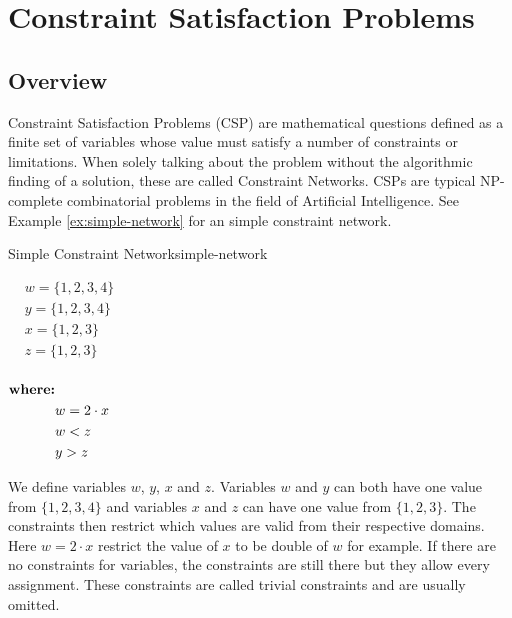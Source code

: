 \chapter{Constraint Satisfaction Problems} \label{chap:CSP}

\section{Overview}

Constraint Satisfaction Problems (CSP) \cite{csp:1987} are mathematical questions defined as a finite set of variables whose value must satisfy a number of constraints or limitations. When solely talking about the problem without the algorithmic finding of a solution, these are called Constraint Networks. CSPs are typical NP-complete combinatorial problems in the field of Artificial Intelligence. See Example \ref{ex:simple-network} for an simple constraint network. \\

\begin{example}{Simple Constraint Network}{simple-network}
	\begin{multicols}{2}
		$\begin{aligned}
				 & w = \{1, 2, 3, 4\} \\
				 & y = \{1, 2, 3, 4\} \\
				 & x = \{1, 2, 3\}    \\
				 & z = \{1, 2, 3\}    \\
			\end{aligned}$

		\columnbreak

		$\begin{aligned}
				\text{\textbf{where:}} &               \\
				                       & w = 2 \cdot x \\
				                       & w < z         \\
				                       & y > z         \\
			\end{aligned}$
	\end{multicols}
\end{example}

We define variables $w$, $y$, $x$ and $z$. Variables $w$ and $y$ can both have one value from $\{1, 2, 3, 4\}$ and variables $x$ and $z$ can have one value from $\{1, 2, 3\}$. The constraints then restrict which values are valid from their respective domains. Here $w = 2 \cdot x$ restrict the value of $x$ to be double of $w$ for example. If there are no constraints for variables, the constraints are still there but they allow every assignment. These constraints are called trivial constraints and are usually omitted.

